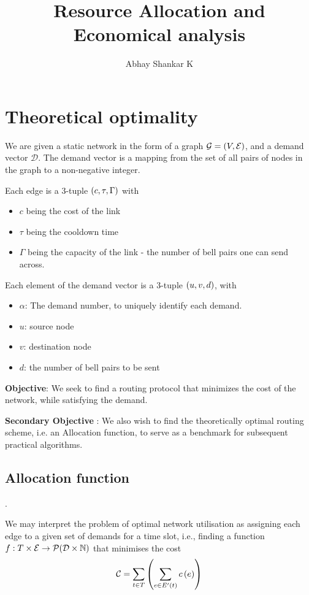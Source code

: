 \documentclass{amsart}
\begin{document}
    \title{Resource Allocation and Economical analysis}
    \author{Abhay Shankar K}
    \maketitle

    \section{Theoretical optimality}

    We are given a static network in the form of a graph \(\mathcal{G} = \left(V, \mathcal{E}\right)\), and a demand vector \(\mathcal{D}\). The demand vector is a mapping from the set of all pairs of nodes in the graph to a non-negative integer. 

    Each edge is a 3-tuple \(\left(c, \tau, \Gamma\right)\) with \begin{itemize}
        \item \(c\) being the cost of the link
        \item \(\tau\) being the cooldown time
        \item \(\Gamma\) being the capacity of the link - the number of bell pairs one can send across.
    \end{itemize}

    Each element of the demand vector is a 3-tuple \(\left(u, v, d\right)\), with \begin{itemize}
        \item \(\alpha\): The demand number, to uniquely identify each demand.
        \item \(u\): source node
        \item \(v\): destination node
        \item \(d\): the number of bell pairs to be sent
    \end{itemize}

    \textbf{Objective}:
    We seek to find a routing protocol that minimizes the cost of the network, while satisfying the demand. 

    \textbf{Secondary Objective} : We also wish to find the theoretically optimal routing scheme, i.e. an Allocation function, to serve as a benchmark for subsequent practical algorithms.
    
    \subsection{Allocation function}.

    We may interpret the problem of optimal network utilisation as assigning each edge to a given set of demands for a time slot, i.e., finding a function \(f : T \times \mathcal{E} \rightarrow \mathcal{P}(\mathcal{D \times \mathbb{N}})\) that minimises the cost 
        \[\mathcal{C} = \sum_{t \in T} \left(\sum_{e \in E'(t)} c\left(e\right)\right)\]
\end{document}

